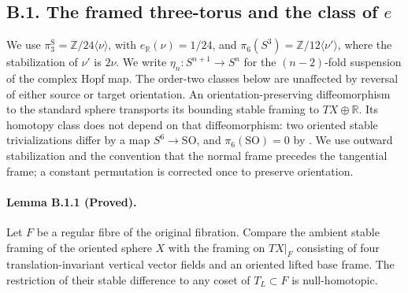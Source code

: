 \subsection{B.1. The framed three-torus and the class of $e$}

We use $\pi_3^{\mathrm S}=\mathbb Z/24\langle\nu\rangle$, with
$e_{\mathbb R}(\nu)=1/24$, and
$\pi_6(S^3)=\mathbb Z/12\langle\nu'\rangle$, where the
stabilization of $\nu'$ is $2\nu$.  We write
$\eta_n:S^{n+1}\to S^n$ for the $(n-2)$-fold suspension of
the complex Hopf map.  The order-two classes below are
unaffected by reversal of either source or target orientation.
An orientation-preserving diffeomorphism to the standard sphere
transports its bounding stable framing to $TX\oplus\mathbb R$.
Its homotopy class does not depend on that diffeomorphism:
two oriented stable trivializations differ by a map
$S^6\to\mathrm{SO}$, and $\pi_6(\mathrm{SO})=0$
by \cite[Corollary to Theorem II and the table on p.~315]{mapsBott59}.
We use outward stabilization and the convention that the normal
frame precedes the tangential frame; a constant permutation is
corrected once to preserve orientation.

\paragraph{Lemma B.1.1 (Proved).}
Let $F$ be a regular fibre of the original fibration.  Compare
the ambient stable framing of the oriented sphere $X$ with
the framing on $TX|_F$ consisting of four translation-invariant
vertical vector fields and an oriented lifted base frame.
The restriction of their stable difference to any coset of
$T_L\subset F$ is null-homotopic.

